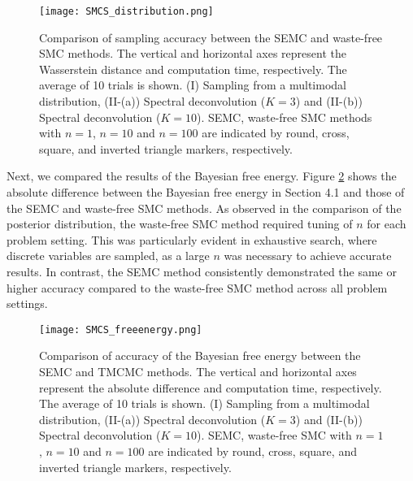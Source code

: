 \documentclass[12pt]{article}
\begin{document}
\begin{figure}[h]
  \centering
  \texttt{[image: SMCS\_distribution.png]}
  \caption{Comparison of sampling accuracy between the SEMC and waste-free SMC methods.
  The vertical and horizontal axes represent the Wasserstein distance and computation time, respectively. 
  The average of 10 trials is shown. 
  (I) Sampling from a multimodal distribution, (II-(a)) Spectral deconvolution ($K=3$) and (II-(b)) Spectral deconvolution ($K=10$). 
  SEMC, waste-free SMC methods with $n=1$, $n=10$ and $n=100$ are indicated by round, cross, square, and inverted triangle markers, respectively. }
  \label{fig:hist_TMCMC}
\end{figure}



Next, we compared the results of the Bayesian free energy.
Figure \ref{fig:free_energy_TMCMC} shows the absolute difference between the Bayesian free energy in Section 4.1 and those of the SEMC and waste-free SMC methods.
As observed in the comparison of the posterior distribution, the waste-free SMC method required tuning of $n$ for each problem setting. 
This was particularly evident in exhaustive search, where discrete variables are sampled, as a large $n$ was necessary to achieve accurate results. 
In contrast, the SEMC method consistently demonstrated the same or higher accuracy compared to the waste-free SMC method across all problem settings. \par 

\begin{figure}[h]
  \centering
  \texttt{[image: SMCS\_freeenergy.png]}
  \caption{Comparison of accuracy of the Bayesian free energy between the SEMC and TMCMC methods. 
  The vertical and horizontal axes represent the absolute difference and computation time, respectively. 
  The average of 10 trials is shown. 
  (I) Sampling from a multimodal distribution, (II-(a)) Spectral deconvolution ($K=3$) and (II-(b)) Spectral deconvolution ($K=10$). 
  SEMC, waste-free SMC with $n=1$, $n=10$ and $n=100$ are indicated by round, cross, square, and inverted triangle markers, respectively. }
  \label{fig:free_energy_TMCMC}
\end{figure}
\end{document}
